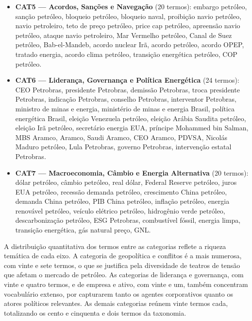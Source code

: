 \begin{itemize}
\item \textbf{CAT5 — Acordos, Sanções e Navegação} (20 termos): embargo petróleo, sanção petróleo, bloqueio petróleo, bloqueio naval, proibição navio petróleo, navio petroleiro, teto de preço petróleo, price cap petróleo, apreensão navio petróleo, ataque navio petroleiro, Mar Vermelho petróleo, Canal de Suez petróleo, Bab-el-Mandeb, acordo nuclear Irã, acordo petróleo, acordo OPEP, tratado energia, acordo clima petróleo, transição energética petróleo, COP petróleo.

\item \textbf{CAT6 — Liderança, Governança e Política Energética} (24 termos): CEO Petrobras, presidente Petrobras, demissão Petrobras, troca presidente Petrobras, indicação Petrobras, conselho Petrobras, interventor Petrobras, ministro de minas e energia, ministério de minas e energia Brasil, política energética Brasil, eleição Venezuela petróleo, eleição Arábia Saudita petróleo, eleição Irã petróleo, secretário energia EUA, príncipe Mohammed bin Salman, MBS Aramco, Aramco, Saudi Aramco, CEO Aramco, PDVSA, Nicolás Maduro petróleo, Lula Petrobras, governo Petrobras, intervenção estatal Petrobras.

\item \textbf{CAT7 — Macroeconomia, Câmbio e Energia Alternativa} (20 termos): dólar petróleo, câmbio petróleo, real dólar, Federal Reserve petróleo, juros EUA petróleo, recessão demanda petróleo, crescimento China petróleo, demanda China petróleo, PIB China petróleo, inflação petróleo, energia renovável petróleo, veículo elétrico petróleo, hidrogênio verde petróleo, descarbonização petróleo, ESG Petrobras, combustível fóssil, energia limpa, transição energética, gás natural preço, GNL.
\end{itemize}

A distribuição quantitativa dos termos entre as categorias reflete a riqueza temática de cada eixo. A categoria de geopolítica e conflitos é a mais numerosa, com vinte e sete termos, o que se justifica pela diversidade de teatros de tensão que afetam o mercado de petróleo. As categorias de liderança e governança, com vinte e quatro termos, e de empresa e ativo, com vinte e um, também concentram vocabulário extenso, por capturarem tanto os agentes corporativos quanto os atores políticos relevantes. As demais categorias reúnem vinte termos cada, totalizando os cento e cinquenta e dois termos da taxonomia.
